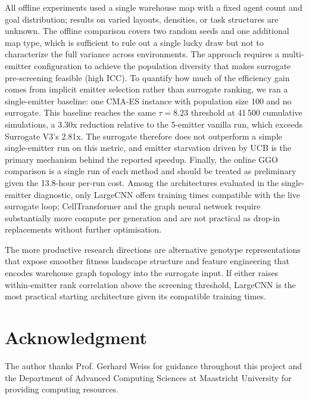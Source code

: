 \documentclass[conference]{IEEEtran}
\begin{document}
All offline experiments used a single warehouse map with a fixed agent
count and goal distribution; results on varied layouts, densities, or task
structures are unknown. The offline comparison covers two random seeds and
one additional map type, which is sufficient to rule out a single lucky
draw but not to characterize the full variance across environments. The
approach requires a multi-emitter configuration to achieve the population
diversity that makes surrogate pre-screening feasible (high ICC). To quantify how much of the efficiency gain comes from implicit emitter
selection rather than surrogate ranking, we ran a single-emitter baseline:
one CMA-ES instance with population size 100 and no surrogate. This baseline
reaches the same $\tau=8.23$ threshold at 41\,500 cumulative simulations, a
3.30x reduction relative to the 5-emitter vanilla run, which exceeds Surrogate
V3's 2.81x. The surrogate therefore does not outperform a simple single-emitter
run on this metric, and emitter starvation driven by UCB is the primary
mechanism behind the reported speedup. Finally, the online GGO comparison is a
single run of each method and should be treated as preliminary given the
13.8-hour per-run cost.
Among the architectures evaluated in the single-emitter diagnostic, only
LargeCNN offers training times compatible with the live surrogate loop;
CellTransformer and the graph neural network require substantially more
compute per generation and are not practical as drop-in replacements
without further optimisation.

The more productive research directions are alternative genotype
representations that expose smoother fitness landscape structure and
feature engineering that encodes warehouse graph topology into the
surrogate input. If either raises within-emitter rank correlation above
the screening threshold, LargeCNN is the most practical starting
architecture given its compatible training times.


\section*{Acknowledgment}

The author thanks Prof. Gerhard Weiss for guidance throughout this project
and the Department of Advanced Computing Sciences at Maastricht University
for providing computing resources.
\end{document}
